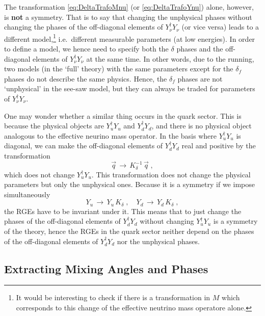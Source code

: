 \documentclass[12pt,a4paper,twoside]{scrartcl}
\numberwithin{equation}{section}
\numberwithin{table}{section}
\begin{document}
The transformation \eqref{eq:DeltaTrafoMnu} (or \eqref{eq:DeltaTrafoYnu})
alone, however, is \textbf{not} a symmetry. That is to say that changing the
unphysical phases without changing the phases of the off-diagonal elements of
$Y_\nu^\dagger Y_\nu$ (or vice versa) leads to a different model,\footnote{It
would be interesting to check if there is a transformation in $M$ which
corresponds to this change of the effective neutrino mass operatore alone.}
i.e.\ different measurable parameters (at low energies). In order to define a
model, we hence need to specify both the $\delta$ phases and the off-diagonal
elements of $Y_\nu^\dagger Y_\nu$ at the same time. In other words, due to the
running, two models (in the `full' theory) with the same parameters except for
the $\delta_f$ phases do not describe the same physics. Hence, the $\delta_f$
phases are not `unphysical' in the see-saw model, but they can always be traded
for parameters of $Y_\nu^\dagger Y_\nu$.

One may wonder whether a similar thing occurs in the quark sector. This is
because the physical objects are $Y_u^\dagger Y_u$ and $Y_d^\dagger Y_d$,  and
there is no physical object analogous to the effective neurino mass operator. In
the basis where $Y_u^\dagger Y_u$ is diagonal, we can make the off-diagonal
elements of $Y_d^\dagger Y_d$ real and positive by the transformation
\begin{equation}
 \vec q\,\to\,K_\delta^{-1}\,\vec q\;,
\end{equation}
which does not change $Y_u^\dagger Y_u$. This transformation does not change
the physical parameters but only the unphysical ones. Because it is a symmetry
if we impose simultaneously
\begin{equation}
 Y_u\,\to\,Y_u\,K_\delta\;,\quad
 Y_d\,\to\,Y_d\,K_\delta\;,
\end{equation}
the RGEs have to be invariant under it. This means that to just change the
phases of the off-diagonal elements of $Y_d^\dagger Y_d$ without changing
$Y_u^\dagger Y_u$ is a symmetry of the theory, hence the RGEs in the quark
sector neither depend on the phases of the off-diagonal elements of $Y_d^\dagger
Y_d$ nor the unphysical phases.

\subsection{Extracting Mixing Angles and Phases}
\label{sec:ExtractingMixingAngles}
\end{document}
